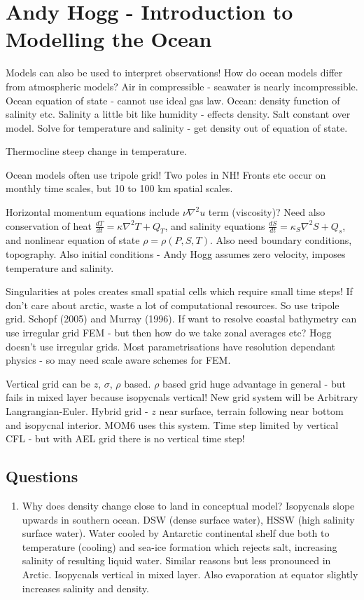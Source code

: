 \documentclass[12pt]{article}
\begin{document}
\section{Andy Hogg - Introduction to Modelling the Ocean}
Models can also be used to interpret observations! How do ocean models differ from atmospheric models? Air in compressible - seawater is nearly incompressible. Ocean equation of state - cannot use ideal gas law. Ocean: density function of salinity etc. Salinity a little bit like humidity - effects density. Salt constant over model. Solve for temperature and salinity - get density out of equation of state. 

Thermocline steep change in temperature.

Ocean models often use tripole grid! Two poles in NH! Fronts etc occur on monthly time scales, but 10 to 100 km spatial scales. 

Horizontal momentum equations include $\nu \nabla^2 u$ term (viscosity)? Need also conservation of heat $\frac{dT}{dt} = \kappa \nabla^2 T + Q_T$, and salinity equations $\frac{dS}{dt} = \kappa_S\nabla^2S + Q_s$, and nonlinear equation of state $\rho=\rho(P,S,T)$. Also need boundary conditions, topography. Also initial conditions - Andy Hogg assumes zero velocity, imposes temperature and salinity. 

Singularities at poles creates small spatial cells which require small time steps! If don't care about arctic, waste a lot of computational resources. So use tripole grid. Schopf (2005) and Murray (1996). If want to resolve coastal bathymetry can use irregular grid FEM - but then how do we take zonal averages etc? Hogg doesn't use irregular grids. Most parametrisations have resolution dependant physics - so may need scale aware schemes for FEM. 

Vertical grid can be $z$, $\sigma$, $\rho$ based. $\rho$ based grid huge advantage in general - but fails in mixed layer because isopycnals vertical! New grid system will be Arbitrary Langrangian-Euler. Hybrid grid - $z$ near surface, terrain following near bottom and isopycnal interior. MOM6 uses this system. Time step limited by vertical CFL - but with AEL grid there is no vertical time step!

\subsection{Questions}
\begin{enumerate}
\item
Why does density change close to land in conceptual model? Isopycnals slope upwards in southern ocean. DSW (dense surface water), HSSW (high salinity surface water). Water cooled by Antarctic continental shelf due both to temperature (cooling) and sea-ice formation which rejects salt, increasing salinity of resulting liquid water. Similar reasons but less pronounced in Arctic. Isopycnals vertical in mixed layer. Also evaporation at equator slightly increases salinity and density. 
\end{enumerate}
\end{document}
